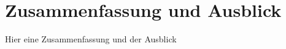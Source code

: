 \section{Zusammenfassung und Ausblick}
\label{sec:ausblick}

    Hier eine Zusammenfassung und der Ausblick


